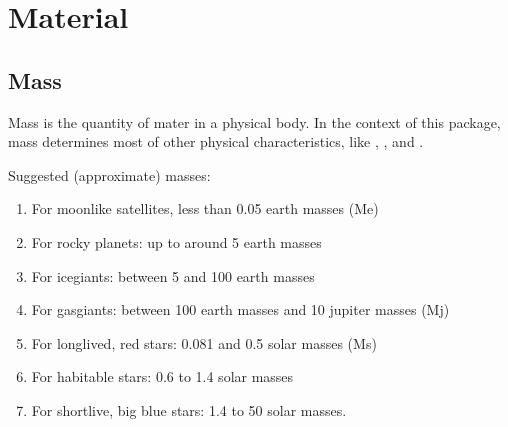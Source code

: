 \documentclass[letterpaper,10pt,english]{sphinxmanual}
\begin{document}
\section{Material}
\label{\detokenize{quantities/material/material:material}}\label{\detokenize{quantities/material/material::doc}}

\subsection{Mass}
\label{\detokenize{quantities/material/mass:mass}}\label{\detokenize{quantities/material/mass::doc}}\label{\detokenize{quantities/material/mass:id1}}
\sphinxAtStartPar
Mass is the quantity of mater in a physical body.
In the context of this package, mass determines most of other physical characteristics,
like {\hyperref[\detokenize{quantities/geometric/radius:id1}]{}}, {\hyperref[\detokenize{quantities/surface/emission/luminosity:id1}]{}}, {\hyperref[\detokenize{quantities/rotational/spin_period:id1}]{}} and
{\hyperref[\detokenize{quantities/life/lifetime:id1}]{}}.

\sphinxAtStartPar
Suggested (approximate) masses:
\begin{enumerate}
%
\item {} 
\sphinxAtStartPar
For moon\sphinxhyphen{}like satellites, less than 0.05 earth masses (Me)

\item {} 
\sphinxAtStartPar
For rocky planets: up to around 5 earth masses

\item {} 
\sphinxAtStartPar
For ice\sphinxhyphen{}giants: between 5 and 100 earth masses

\item {} 
\sphinxAtStartPar
For gas\sphinxhyphen{}giants: between 100 earth masses and 10 jupiter masses (Mj)

\item {} 
\sphinxAtStartPar
For long\sphinxhyphen{}lived, red stars: 0.081 and 0.5 solar masses (Ms)

\item {} 
\sphinxAtStartPar
For habitable stars: 0.6 to 1.4 solar masses

\item {} 
\sphinxAtStartPar
For short\sphinxhyphen{}live, big blue stars: 1.4 to 50 solar masses.

\end{enumerate}
\end{document}
